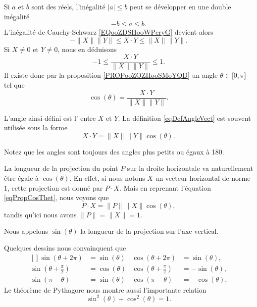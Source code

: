 Si $a$ et $b$ sont des réels, l'inégalité $| a |\leq b$ peut se développer en une double inégalité
\begin{equation}
	-b\leq a\leq b.
\end{equation}
L'inégalité de Cauchy-Schwarz \eqref{EQooZDSHooWPcryG} devient alors
\begin{equation}
	-\| X \|\| Y \|\leq X\cdot Y\leq\| X \|\| Y \|.
\end{equation}
Si $X\neq 0$ et $Y\neq 0$, nous en déduisons
\begin{equation}
	-1\leq\frac{ X\cdot Y }{ \| X \|\| Y \| }\leq 1.
\end{equation}
Il existe donc par la proposition \ref{PROPooZOZHooSMoYQD} un angle $\theta\in\mathopen[ 0 , \pi \mathclose]$ tel que
\begin{equation}		\label{eqDefAngleVect}
	\cos(\theta)=\frac{ X\cdot Y }{ \| X \|\| Y \| }.
\end{equation}

\begin{definition}      \label{DEFooSVDZooPWHwFQ}
L'angle ainsi défini est l' entre $X$ et $Y$. La définition \eqref{eqDefAngleVect} est souvent utilisée sous la forme
\begin{equation}		\label{eqPropCosThet}
	X\cdot Y=\| X \|\| Y \|\cos(\theta).
\end{equation}
\end{definition}

Notez que les angles sont toujours des angles plus petits ou égaux à \unit{180}{\degree}.

La longueur de la projection du point $P$ sur la droite horizontale va naturellement être égale à $\cos(\theta)$. En effet, si nous notons $X$ un vecteur horizontal de norme $1$, cette projection est donné par $P\cdot X$. Mais en reprenant l'équation \eqref{eqPropCosThet}, nous voyons que
\begin{equation}
	P\cdot X=\| P \|\| X \|\cos(\theta),
\end{equation}
tandis qu'ici nous avons $\| P \|=\| X \|=1$.

Nous appelons $\sin(\theta)$ la longueur de la projection sur l'axe vertical.

Quelques dessins nous convainquent que 
\begin{equation}
	\begin{aligned}[]
		\sin(\theta+2\pi)&=\sin(\theta)&\cos(\theta+2\pi)&=\sin(\theta),\\
		\sin(\theta+\frac{ \pi }{2})&=\cos(\theta)&\cos(\theta+\frac{ \pi }{2})&=-\sin(\theta),\\
		\sin(\pi-\theta)&=\sin(\theta)&\cos(\pi-\theta)&=-\cos(\theta).
	\end{aligned}
\end{equation}
Le théorème de Pythagore nous montre aussi l'importante relation
\begin{equation}
	\sin^2(\theta)+\cos^2(\theta)=1.
\end{equation}

